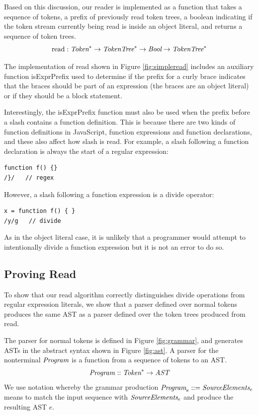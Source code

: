 \documentclass[preprint,10pt]{sigplanconf}
\begin{document}
Based on this discussion, our reader is implemented as
a function that takes a sequence of tokens, a prefix of previously read token trees, a boolean indicating if the token stream currently being read is inside an object literal, and returns a sequence of token trees.
\[
\textrm{read} : \textit{Token}^{*} \rightarrow \textit{TokenTree}^{*} 
\rightarrow \textit{Bool} \rightarrow \textit{TokenTree}^{*}
\]

The implementation of read shown in Figure \ref{fig:simpleread} includes an auxiliary function isExprPrefix used to determine if the prefix for a curly brace indicates that the braces should be part of an expression (\ie the braces are an object literal) or if they should be a block statement.

Interestingly, the isExprPrefix function must also be used when the prefix before a slash contains a function definition. This is because there are two kinds of function definitions in JavaScript, function expressions and function declarations, and these also affect how slash is read. For example, a slash following a function declaration is always the start of a regular expression:
\begin{lstlisting}
function f() {}
/}/   // regex
\end{lstlisting}
However, a slash following a function expression is a divide operator:
\begin{lstlisting}
x = function f() { } 
/y/g   // divide
\end{lstlisting}
As in the object literal case, it is unlikely that a programmer would attempt to intentionally divide a function expression but it is not an error to do so.



\subsection{Proving Read}
\label{sec:provingread}

To show that our read algorithm correctly distinguishes 
divide operations from regular expression literals, we show that
a parser defined over normal tokens produces the same AST as a parser
defined over the token trees produced from read.

The parser for normal tokens is defined in Figure \ref{fig:grammar},
and generates ASTs in the abstract syntax shown in Figure \ref{fig:ast}. A
parser for the nonterminal \( \textit{Program}_{} \) is a function from a
sequence of tokens to an AST.
\[
\textit{Program}_{} :: \textit{Token}^* \rightarrow \textit{AST}
\]
We use notation whereby the grammar production $\textit{Program}_{e} ::= \textit{SourceElements}_{e}$
means to match the input sequence with $\textit{SourceElements}_{e}$ and
produce the resulting AST $e$.
\end{document}
